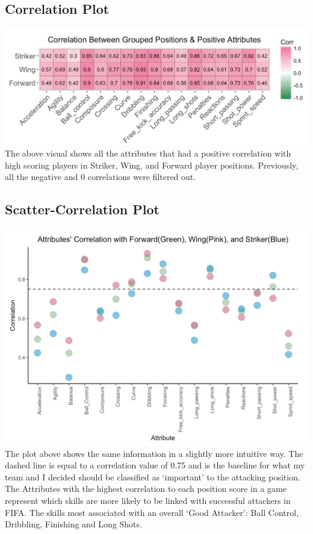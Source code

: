 \documentclass[]{article}
\begin{document}
\subsection{Correlation Plot}\label{correlation-plot}

\includegraphics[width=1\linewidth]{images/corrplot1} The above visual
shows all the attributes that had a positive correlation with high
scoring players in Striker, Wing, and Forward player positions.
Previously, all the negative and 0 correlations were filtered out.

\subsection{Scatter-Correlation Plot}\label{scatter-correlation-plot}

\includegraphics[width=1\linewidth]{images/corrplot2} The plot above
shows the same information in a slightly more intuitive way. The dashed
line is equal to a correlation value of 0.75 and is the baseline for
what my team and I decided should be classified as `important' to the
attacking position. The Attributes with the highest correlation to each
position score in a game represent which skills are more likely to be
linked with successful attackers in FIFA. The skills most associated
with an overall `Good Attacker': Ball Control, Dribbling, Finishing and
Long Shots.
\end{document}
